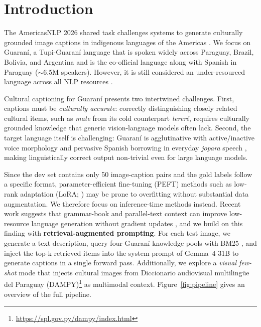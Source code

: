 \documentclass[11pt]{article}
\begin{document}
\section{Introduction}

The AmericasNLP 2026 shared task challenges systems to generate culturally grounded image captions in indigenous languages of the Americas
\cite{ebrahimi-etal-2023-findings}.
We focus on Guaran\'{i}, a Tupi-Guaraní language that is spoken widely across Paraguay, Brazil, Bolivia, and
Argentina and is the co-official language along with Spanish in Paraguay ($\sim$6.5M speakers). However, it is still considered an under-resourced language across all NLP resources
\cite{chiruzzo-etal-2020-development}.

Cultural captioning for Guaran\'{i} presents two intertwined challenges.
First, captions must be \textit{culturally accurate}: correctly distinguishing
closely related cultural items, such as \textit{mate} from its cold counterpart
\textit{terer\'{e}}, requires culturally grounded knowledge that generic
vision-language models often lack.
Second, the target language itself is challenging: Guaran\'{i} is agglutinative
with active/inactive voice morphology and pervasive Spanish borrowing in
everyday \textit{jopara} speech \cite{estigarribia2020}, making linguistically
correct output non-trivial even for large language models.

Since the dev set contains only 50 image-caption pairs and the gold labels
follow a specific format, parameter-efficient fine-tuning (PEFT) methods \cite{peft} such as
low-rank adaptation (LoRA; \citealp{hu2022lora}) may be prone to
overfitting without substantial data augmentation. We therefore focus on
inference-time methods instead.
Recent work suggests that grammar-book and parallel-text context can
improve low-resource language generation without gradient updates
\cite{tanzer2023,aycock2025can,zhang-etal-2025-read}, and we build on this finding with
\textbf{retrieval-augmented prompting}.
For each test image, we generate a text description, query four Guaran\'{i}
knowledge pools with BM25 \cite{robertson2009bm25}, and inject the top-k
retrieved items into the system prompt of Gemma~4 31B \cite{gemmateam2025gemma4}
to generate captions in a single forward pass.
Additionally, we explore a \textit{visual few-shot} mode that injects cultural images from Diccionario audiovisual multilingüe del Paraguay (DAMPY)\footnote{\url{https://spl.gov.py/dampy/index.html}} as multimodal context.
Figure~\ref{fig:pipeline} gives an overview of the full pipeline.
\end{document}
